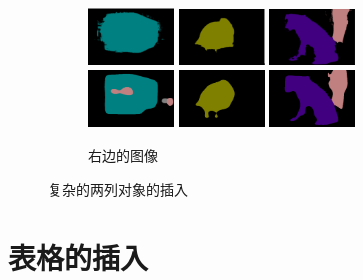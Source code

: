 \begin{figure}[h!]
\begin{subfigure}{0.4\textwidth}
		\includegraphics[width=0.25\textwidth]{image/chap04/result/compare/deeplab_bus.png}
		\includegraphics[width=0.25\textwidth]{image/chap04/result/compare/deeplab_bird.png}
		\includegraphics[width=0.25\textwidth]{image/chap04/result/compare/deeplab_dog.png} \\
		\includegraphics[width=0.25\textwidth]{image/chap04/result/compare/my_bus.png}
		\includegraphics[width=0.25\textwidth]{image/chap04/result/compare/my_bird.png}
		\includegraphics[width=0.25\textwidth]{image/chap04/result/compare/my_dog.png} 
		\caption{右边的图像}
		\label{fig:compare2}
	\end{subfigure}
	\caption{复杂的两列对象的插入}
	\label{fig:complex}
\end{figure}


\clearpage

\section{表格的插入}

